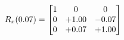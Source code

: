 \documentclass[preview]{standalone}
\begin{document}
\begin{align*}
\special{dvisvgm:raw <g id='unique000'>}R_{x}(0.07) = \begin{bmatrix}1 & 0 & 0 \\0 & +1.00 & -0.07 \\0 & +0.07 & +1.00\end{bmatrix}\special{dvisvgm:raw </g>}
\end{align*}
\end{document}
